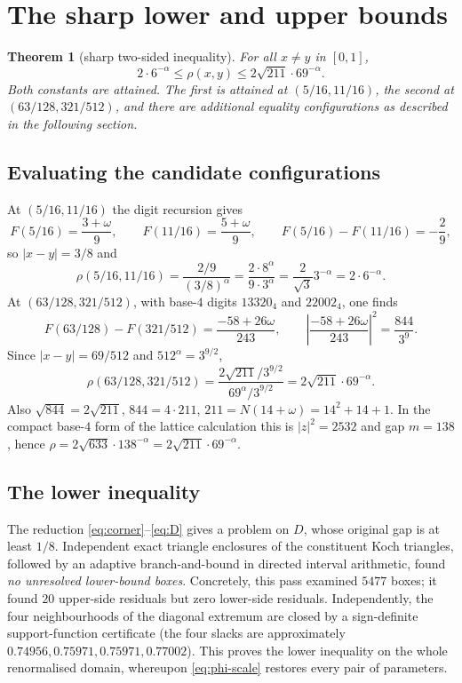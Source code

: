 \documentclass[11pt]{article}
\newtheorem{theorem}{Theorem}[section]
\theoremstyle{remark}
\newcommand{\w}{\omega}
\begin{document}
\section{The sharp lower and upper bounds}
\begin{theorem}[sharp two-sided inequality]\label{thm:main}
For all $x\ne y$ in $[0,1]$,
\begin{equation}\label{eq:bounds}
  2\cdot6^{-\alpha}\le \rho(x,y)\le 2\sqrt{211}\cdot69^{-\alpha}.
\end{equation}
Both constants are attained. The first is attained at $(5/16,11/16)$, the second at
$(63/128,321/512)$, and there are additional equality configurations as described in the following
section.
\end{theorem}

\subsection{Evaluating the candidate configurations}
At $(5/16,11/16)$ the digit recursion gives
\[
  F(5/16)=\frac{3+\w}{9},\qquad F(11/16)=\frac{5+\w}{9},\qquad
  F(5/16)-F(11/16)=-\frac29,
\]
so $|x-y|=3/8$ and
\[
  \rho(5/16,11/16)=\frac{2/9}{(3/8)^{\alpha}}
  =\frac{2\cdot 8^{\alpha}}{9\cdot3^{\alpha}}
  =\frac{2}{\sqrt3}3^{-\alpha}=2\cdot6^{-\alpha}.
\]
At $(63/128,321/512)$, with base-$4$ digits $13320_4$ and $22002_4$, one finds
\[
  F(63/128)-F(321/512)=\frac{-58+26\w}{243},\qquad
  \left|\frac{-58+26\w}{243}\right|^2=\frac{844}{3^9}.
\]
Since $|x-y|=69/512$ and $512^{\alpha}=3^{9/2}$,
\[
  \rho(63/128,321/512)=\frac{2\sqrt{211}/3^{9/2}}{69^{\alpha}/3^{9/2}}
  =2\sqrt{211}\cdot69^{-\alpha}.
\]
Also $\sqrt{844}=2\sqrt{211}$, $844=4\cdot211$, $211=N(14+\w)=14^2+14+1$. In the compact base-$4$
form of the lattice calculation this is $|z|^2=2532$ and gap $m=138$, hence
$\rho=2\sqrt{633}\cdot138^{-\alpha}=2\sqrt{211}\cdot69^{-\alpha}$.

\subsection{The lower inequality}
The reduction \eqref{eq:corner}--\eqref{eq:D} gives a problem on $D$, whose original gap is at least
$1/8$. Independent exact triangle enclosures of the constituent Koch triangles, followed by an
adaptive branch-and-bound in directed interval arithmetic, found \emph{no unresolved lower-bound
boxes}. Concretely, this pass examined $5477$ boxes; it found $20$ upper-side residuals but zero
lower-side residuals. Independently, the four neighbourhoods of the diagonal extremum are closed by
a sign-definite support-function certificate (the four slacks are approximately
$0.74956,0.75971,0.75971,0.77002$). This proves the lower inequality on the whole renormalised
domain, whereupon \eqref{eq:phi-scale} restores every pair of parameters.
\end{document}
